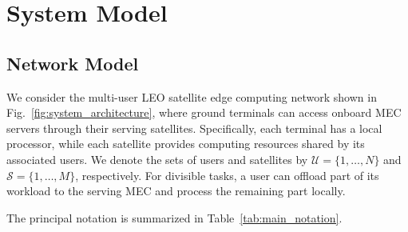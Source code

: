 \documentclass[journal]{IEEEtran}
\begin{document}
\section{System Model}
\label{sec:system_model}

\subsection{Network Model}
\label{subsec:network_model}

We consider the multi-user LEO satellite edge computing
network shown in Fig.~\ref{fig:system_architecture}, where
ground terminals can access onboard MEC servers through
their serving satellites. Specifically, each terminal has
a local processor, while each satellite provides computing
resources shared by its associated users. We denote the
sets of users and satellites by
$\mathcal{U}=\{1,\ldots,N\}$ and
$\mathcal{S}=\{1,\ldots,M\}$, respectively.
For divisible tasks, a user can offload part of its workload
to the serving MEC and process the remaining part locally.

The principal notation is summarized in
Table~\ref{tab:main_notation}.
\end{document}
